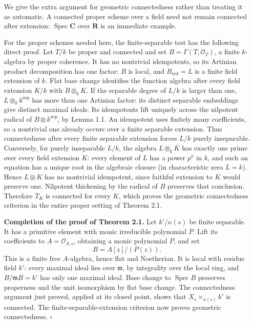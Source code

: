 \documentclass[11pt]{article}
\begin{document}
We give the extra argument for geometric connectedness rather than
treating it as automatic. A connected proper scheme over a field need
not remain connected after extension: \(\operatorname{Spec}\mathbf C\)
over \(\mathbf R\) is an immediate example.

For the proper schemes needed here, the finite-separable test has the
following direct proof. Let \(T/k\) be proper and connected and set
\(B=\Gamma(T,\mathcal O_T)\), a finite \(k\)-algebra by proper
coherence. It has no nontrivial idempotents, so its Artinian product
decomposition has one factor: \(B\) is local, and \(B_{\mathrm{red}}=L\)
is a finite field extension of \(k\). Flat base change identifies the
function algebra after every field extension \(K/k\) with
\(B\otimes_kK\). If the separable degree of \(L/k\) is larger than one,
\(L\otimes_k k^{\mathrm{sep}}\) has more than one Artinian factor: its
distinct separable embeddings give distinct maximal ideals. Its
idempotents lift uniquely across the nilpotent radical of
\(B\otimes k^{\mathrm{sep}}\), by Lemma 1.1. An idempotent uses finitely
many coefficients, so a nontrivial one already occurs over a finite
separable extension. Thus connectedness after every finite separable
extension forces \(L/k\) purely inseparable. Conversely, for purely
inseparable \(L/k\), the algebra \(L\otimes_k\overline K\) has exactly
one prime over every field extension \(K\): every element of \(L\) has a
power \(p^a\) in \(k\), and such an equation has a unique root in the
algebraic closure (in characteristic zero \(L=k\)). Hence \(L\otimes K\)
has no nontrivial idempotent, since faithful extension to
\(\overline K\) would preserve one. Nilpotent thickening by the radical
of \(B\) preserves that conclusion. Therefore \(T_K\) is connected for
every \(K\), which proves the geometric connectedness criterion in the
entire proper setting of Theorem 2.1.

\textbf{Completion of the proof of Theorem 2.1.} Let \(k'/\kappa(s)\) be
finite separable. It has a primitive element with monic irreducible
polynomial \(\overline P\). Lift its coefficients to
\(A=\mathcal O_{S,s}\), obtaining a monic polynomial \(P\), and set \[
B=A[z]/(P(z)).
\] This is a finite free \(A\)-algebra, hence flat and Noetherian. It is
local with residue field \(k'\): every maximal ideal lies over
\(\mathfrak m\), by integrality over the local ring, and
\(B/\mathfrak mB=k'\) has only one maximal ideal. Base change to
\(\operatorname{Spec}B\) preserves properness and the unit isomorphism
by flat base change. The connectedness argument just proved, applied at
its closed point, shows that \(X_s\times_{\kappa(s)}k'\) is connected.
The finite-separable-extension criterion now proves geometric
connectedness. \(\square\)
\end{document}
